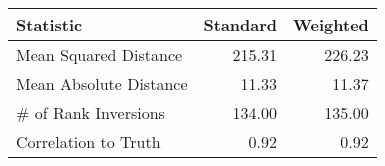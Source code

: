 \begin{tabular}{lrr}
  \hline
Statistic & Standard & Weighted \\ 
  \hline
Mean Squared Distance & 215.31 & 226.23 \\ 
  Mean Absolute Distance & 11.33 & 11.37 \\ 
  \# of Rank Inversions & 134.00 & 135.00 \\ 
  Correlation to Truth & 0.92 & 0.92 \\ 
   \hline
\end{tabular}
